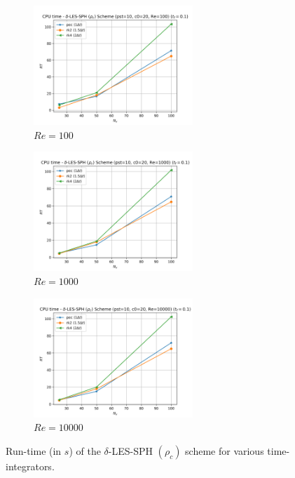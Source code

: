 \begin{figure}[H]
  \begin{subfigure}{7cm}
    \centering\includegraphics[width=6cm]{Code-Figures/deltales/integrator/pois_rt_pst_10_c0_20_re_100.png}
    \caption{$Re = 100$}
  \end{subfigure}
  \begin{subfigure}{7cm}
    \centering\includegraphics[width=6cm]{Code-Figures/deltales/integrator/pois_rt_pst_10_c0_20_re_1000.png}
    \caption{$Re = 1000$}
  \end{subfigure}
  \begin{subfigure}{7cm}
    \centering\includegraphics[width=6cm]{Code-Figures/deltales/integrator/pois_rt_pst_10_c0_20_re_10000.png}
    \caption{$Re = 10000$}
  \end{subfigure}
  \caption{Run-time (in $s$) of the $\delta$-LES-SPH $(\rho_c)$ scheme for various time-integrators.}
  \label{fig:deltales-integrator-rt}
\end{figure}

